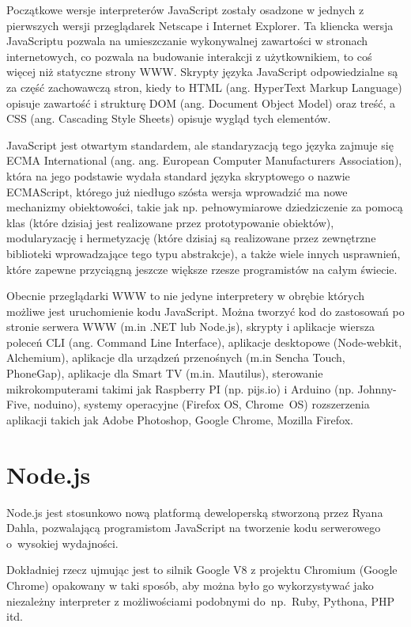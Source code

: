 \documentclass[twoside,a4paper,openright,12pt]{book}
\begin{document}
Początkowe wersje interpreterów JavaScript zostały osadzone w jednych z pierwszych wersji przeglądarek Netscape i Internet Explorer. Ta kliencka wersja JavaScriptu pozwala na umieszczanie wykonywalnej zawartości w stronach internetowych, co pozwala na budowanie interakcji z użytkownikiem, to coś więcej niż statyczne strony WWW. Skrypty języka JavaScript odpowiedzialne są za część zachowawczą stron, kiedy to HTML (ang. HyperText Markup Language) opisuje zawartość i strukturę DOM (ang. Document Object Model) oraz treść, a CSS (ang. Cascading Style Sheets) opisuje wygląd tych elementów.

JavaScript jest otwartym standardem, ale standaryzacją tego języka zajmuje się ECMA International (ang. ang. European Computer Manufacturers Association), która na jego podstawie wydała standard języka skryptowego o nazwie ECMAScript, którego już niedługo szósta wersja wprowadzić ma nowe mechanizmy obiektowości, takie jak np. pełnowymiarowe dziedziczenie za pomocą klas (które dzisiaj jest realizowane przez prototypowanie obiektów), modularyzację i hermetyzację (które dzisiaj są realizowane przez zewnętrzne biblioteki wprowadzające tego typu abstrakcje), a także wiele innych usprawnień, które zapewne przyciągną jeszcze większe rzesze programistów na całym świecie.

Obecnie przeglądarki WWW to nie jedyne interpretery w obrębie których możliwe jest uruchomienie kodu JavaScript. Można tworzyć kod do zastosowań po stronie serwera WWW (m.in .NET lub Node.js), skrypty i aplikacje wiersza poleceń CLI (ang. Command Line Interface), aplikacje desktopowe (Node-webkit, Alchemium), aplikacje dla urządzeń przenośnych (m.in Sencha Touch, PhoneGap), aplikacje dla Smart TV (m.in. Mautilus), sterowanie mikrokomputerami takimi jak Raspberry PI (np. pijs.io) i Arduino (np. Johnny-Five, noduino), systemy operacyjne (Firefox OS, Chrome~OS) rozszerzenia aplikacji takich jak Adobe Photoshop, Google Chrome, Mozilla Firefox.


\section{Node.js}

Node.js jest stosunkowo nową platformą deweloperską stworzoną przez Ryana Dahla, pozwalającą programistom JavaScript na tworzenie kodu serwerowego o~wysokiej wydajności.

Dokładniej rzecz ujmując jest to silnik Google V8 z projektu Chromium (Google Chrome) opakowany w taki sposób, aby można było go wykorzystywać jako niezależny interpreter z możliwościami podobnymi do~np.~Ruby, Pythona, PHP itd.
\end{document}
